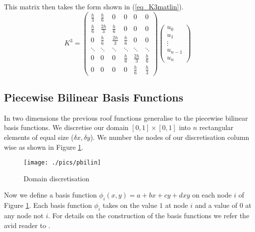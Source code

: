 \documentclass[11pt,fleqn]{article}
\theoremstyle{defstyle}
\begin{document}
This matrix then takes the form shown in (\ref{eq_K3matlin}).
\begin{equation}
K^3 = \begin{pmatrix}
\frac{h}{3} & \frac{h}{6} &0& 0 & 0 &  0\\
\frac{h}{6} & \frac{2h}{3} & \frac{h}{6} & 0 & 0 &  0\\
0 & \frac{h}{6} & \frac{2h}{3} & \frac{h}{6} & 0 & 0  \\
\ddots & \ddots & \ddots & \ddots & \ddots & \ddots \\
0 & 0 & 0  & \frac{h}{6}& \frac{2h}{3} & \frac{h}{6} \\
0 & 0 & 0 & 0 &\frac{h}{6} & \frac{h}{3}   
\end{pmatrix}
\begin{pmatrix}
u_0 \\ u_1 \\ \vdots \\ u_{n-1} \\ u_n
\end{pmatrix}
\label{eq_K3matlin}
\end{equation} 
 
\subsection{Piecewise Bilinear Basis Functions}
\label{section_pbbf}
In two dimensions the previous roof functions generalise to the piecewise bilinear basis functions. We discretise our domain $[0,1] \times [0,1]$ into $n$ rectangular elements of equal size ($\delta x, \delta y$). We number the nodes of our discretisation column wise as shown in Figure \ref{fig_pbilindomain}.
\begin{figure}[H] 
\centering
\texttt{[image: ./pics/pbilin]}
\caption{Domain discretisation} 
\label{fig_pbilindomain}
\end{figure}
Now we define a basis function $\phi_i(x,y) = a+ bx +cy +dxy$ on each node $i$ of Figure \ref{fig_pbilindomain}. Each basis function $\phi_i$ takes on the value $1$ at node $i$ and a value of $0$ at any node not $i$. For details on the construction of the basis functions we refer the avid reader to \cite{vrb}. 
\end{document}
